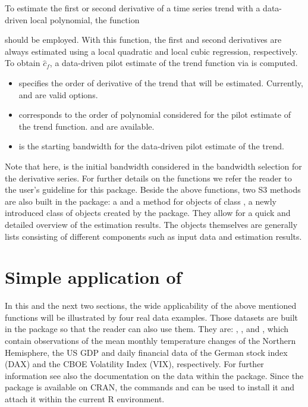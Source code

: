 To estimate the first or second derivative of a time series trend with a data-driven local polynomial, the function 
\vspace{-2mm}
\begin{center} 
\end{center}
\vspace{-2mm}
\noindent
should be employed. With this function, the first and second derivatives are always estimated using a local quadratic and local cubic regression, respectively. To obtain $\hat{c}_f$, a data-driven pilot estimate of the trend function via  is computed.
\begin{itemize}
	\item {} specifies the order of derivative of the trend that will be estimated. Currently,  and  are valid options.
	\item {} corresponds to the order of polynomial considered for the pilot estimate of the trend function.  and  are available.
	\item {} is the starting bandwidth for the data-driven pilot estimate of the trend. 
\end{itemize} 
Note that here,  is the initial bandwidth considered in the bandwidth selection for the derivative series. For further details on the functions we refer the reader to the user's guideline for this package. Beside the above functions, two S3 methods are also built in the package: a  and a  method for objects of class , a newly introduced class of objects created by the  package. They allow for a quick and detailed overview of the estimation results. The  objects themselves are generally lists consisting of different components such as input data and estimation results.  

\section{Simple application of } \label{sec:application}

In this and the next two sections, the wide applicability of the above mentioned functions will be illustrated by four real data examples. Those datasets are built in the package so that the reader can also use them. They are: , ,  and , which contain observations of the mean monthly temperature changes of the Northern Hemisphere, the US GDP and daily financial data of the German stock index (DAX) and the CBOE Volatility Index (VIX), respectively.
For further information see also the documentation on the data within the  package. Since the package is available on CRAN, the commands  and  can be used to install it and attach it within the current R environment.

